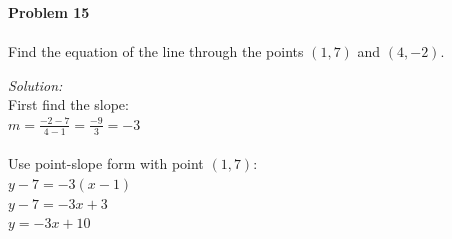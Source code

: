 \documentclass[12pt]{article}
\begin{document}

            \newpage

            \textbf{Problem 15}\\\\
            Find the equation of the line through the points $(1, 7)$ and $(4, -2)$.

            \textit{Solution:}\\
            First find the slope:\\
            $m = \displaystyle\frac{-2 - 7}{4 - 1} = \frac{-9}{3} = -3$\\
            \\
            Use point-slope form with point $(1, 7)$:\\
            $y - 7 = -3(x - 1)$\\
            $y - 7 = -3x + 3$\\
            $y = -3x + 10$

\end{document}
